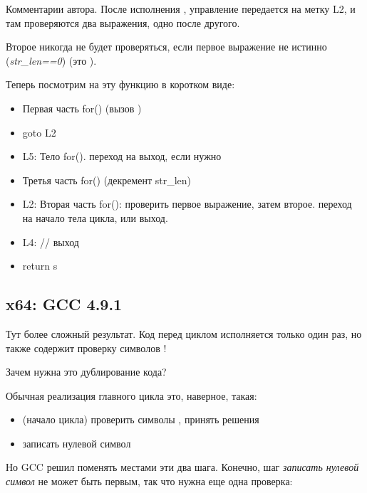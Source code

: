 

Комментарии автора.
После исполнения \strlen{}, управление передается на метку L2,
и там проверяются два выражения, одно после другого.

Второе никогда не будет проверяться, если первое выражение не истинно (\emph{str\_len==0})
(это ).

Теперь посмотрим на эту функцию в коротком виде:

\begin{itemize}
\item Первая часть for() (вызов \strlen{})
\item goto L2
\item L5: Тело for(). переход на выход, если нужно
\item Третья часть for() (декремент str\_len)
\item L2: Вторая часть for(): проверить первое выражение, затем второе. 
переход на начало тела цикла, или выход.

\item L4: // выход
\item return s
\end{itemize}

\subsection{x64: \Optimizing GCC 4.9.1}
\label{string_trim_GCC_x64_O3}



Тут более сложный результат.
Код перед циклом исполняется только один раз, но также содержит проверку символов \CRLF{}!

Зачем нужна это дублирование кода?

Обычная реализация главного цикла это, наверное, такая:

\begin{itemize}
\item (начало цикла) проверить символы \CRLF{}, принять решения

\item записать нулевой символ
\end{itemize}

Но GCC решил поменять местами эти два шага. 
Конечно, шаг \emph{записать нулевой символ} не может быть первым, так что нужна еще одна
проверка:

